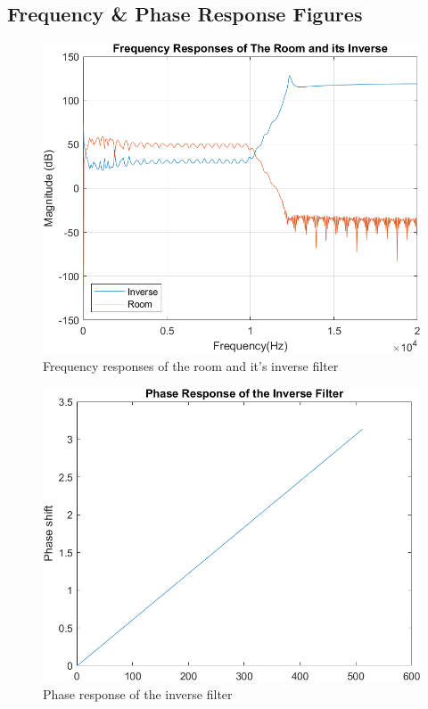 \documentclass[conference]{IEEEtran}
\begin{document}
    \subsection{Frequency \& Phase Response Figures}
        \begin{figure}[H]
            \centering
            \includegraphics[scale = 0.55]{resources/origAndInverse1.png}
            \caption{Frequency responses of the room and it's inverse filter}
            \label{origAndInverse1}
        \end{figure}
        \begin{figure}[H]
            \centering
            \includegraphics[scale = 0.55]{resources/phaseResp.png}
            \caption{Phase response of the inverse filter}
            \label{phaseResp}
        \end{figure}
\end{document}
